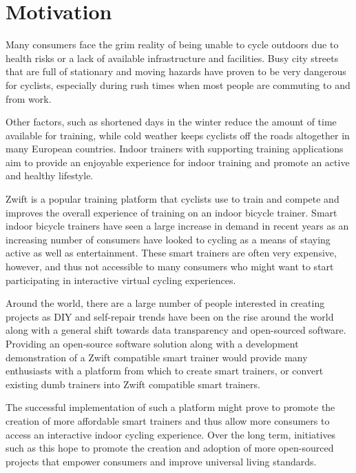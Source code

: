 \vspace*{-0.5cm}

\section{Motivation}

Many consumers face the grim reality of being unable to cycle outdoors due to health risks or a lack of available infrastructure and facilities. Busy city streets that are full of stationary and moving hazards have proven to be very dangerous for cyclists, especially during rush times when most people are commuting to and from work. 

Other factors, such as shortened days in the winter reduce the amount of time available for training, while cold weather keeps cyclists off the roads altogether in many European countries. Indoor trainers with supporting training applications aim to provide an enjoyable experience for indoor training and promote an active and healthy lifestyle. 

Zwift is a popular training platform that cyclists use to train and compete and improves the overall experience of training on an indoor bicycle trainer. Smart indoor bicycle trainers have seen a large increase in demand in recent years as an increasing number of consumers have looked to cycling as a means of staying active as well as entertainment. These smart trainers are often very expensive, however, and thus not accessible to many consumers who might want to start participating in interactive virtual cycling experiences.

Around the world, there are a large number of people interested in creating projects as DIY and self-repair trends have been on the rise around the world along with a general shift towards data transparency and open-sourced software. Providing an open-source software solution along with a development demonstration of a Zwift compatible smart trainer would provide many enthusiasts with a platform from which to create smart trainers, or convert existing dumb trainers into Zwift compatible smart trainers.

The successful implementation of such a platform might prove to promote the creation of more affordable smart trainers and thus allow more consumers to access an interactive indoor cycling experience. Over the long term, initiatives such as this hope to promote the creation and adoption of more open-sourced projects that empower consumers and improve universal living standards.